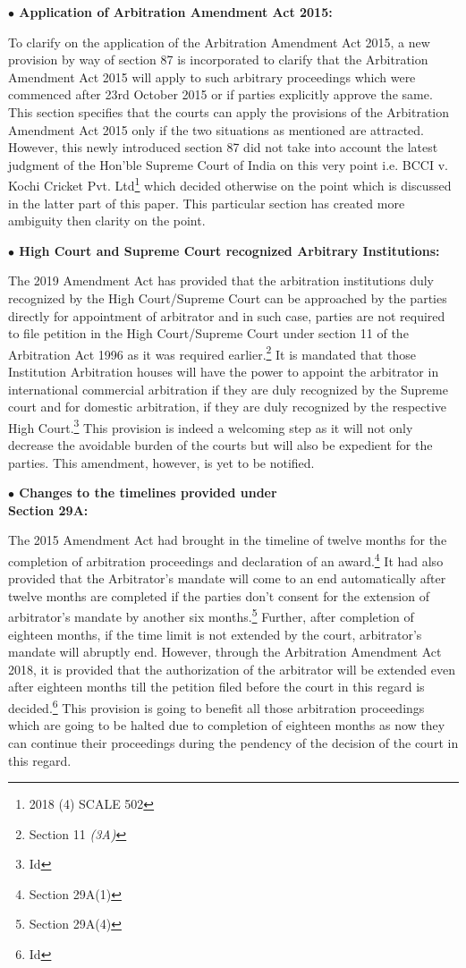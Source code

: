 \begin{multicols}{2}
\noi
{\large \bfseries $\bullet$ Application of Arbitration Amendment Act 2015:}

\noi
To clarify on the application of the Arbitration Amendment Act 2015, a new provision by
way of section 87 is incorporated to clarify that the Arbitration Amendment Act 2015 will
apply to such arbitrary proceedings which were commenced after 23rd October 2015 or if
parties explicitly approve the same. This section specifies that the courts can apply the
provisions of the Arbitration Amendment Act 2015 only if the two situations as mentioned 
are attracted. However, this newly introduced section 87 did not take into account the latest
judgment of the Hon’ble Supreme Court of India on this very point i.e. BCCI v. Kochi
Cricket Pvt. Ltd\footnote{2018 (4) SCALE 502} which decided otherwise on the point which is discussed in the latter part
of this paper. This particular section has created more ambiguity then clarity on the point.

\noi
{\large \bfseries $\bullet$ High Court and Supreme Court recognized Arbitrary Institutions:}

\noi
The 2019 Amendment Act has provided that the arbitration institutions duly recognized by
the High Court/Supreme Court can be approached by the parties directly for appointment of
arbitrator and in such case, parties are not required to file petition in the High Court/Supreme
Court under section 11 of the Arbitration Act 1996 as it was required earlier.\footnote{Section 11 \textit{(3A)}} It is mandated
that those Institution Arbitration houses will have the power to appoint the arbitrator in
international commercial arbitration if they are duly recognized by the Supreme court and for
domestic arbitration, if they are duly recognized by the respective High Court.\footnote{Id} This
provision is indeed a welcoming step as it will not only decrease the avoidable burden of the
courts but will also be expedient for the parties. This amendment, however, is yet to be
notified.

\noi
{\large \bfseries $\bullet$ Changes to the timelines provided under\\ Section 29A:}

\noi
The 2015 Amendment Act had brought in the timeline of twelve months for the completion
of arbitration proceedings and declaration of an award.\footnote{Section 29A(1)} It had also provided that the
Arbitrator’s mandate will come to an end automatically after twelve months are completed if
the parties don’t consent for the extension of arbitrator’s mandate by another six months.\footnote{Section 29A(4)}
Further, after completion of eighteen months, if the time limit is not extended by the court,
arbitrator’s mandate will abruptly end. However, through the Arbitration Amendment Act
2018, it is provided that the authorization of the arbitrator will be extended even after
eighteen months till the petition filed before the court in this regard is decided.\footnote{Id} This
provision is going to benefit all those arbitration proceedings which are going to be halted 
due to completion of eighteen months as now they can continue their proceedings during the
pendency of the decision of the court in this regard.


\end{multicols}
